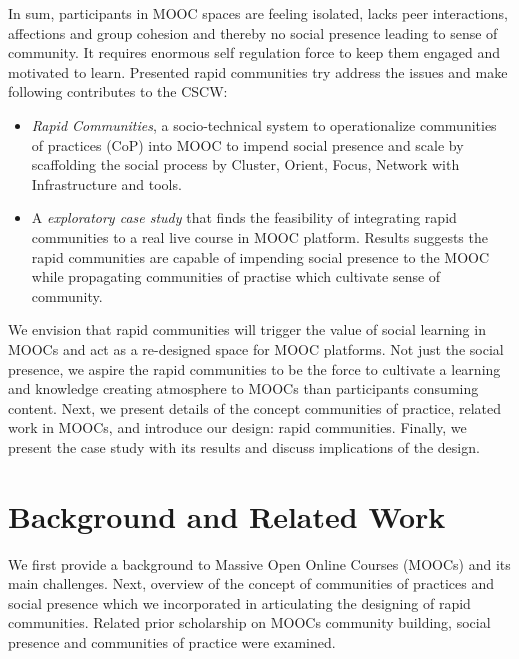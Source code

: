 \documentclass[manuscript,screen,review]{acmart}
\begin{document}
In sum, participants in MOOC spaces are feeling isolated, lacks peer interactions, affections and group cohesion  and thereby no social presence leading to sense of community. It requires enormous self regulation force to keep them engaged and motivated to learn. Presented rapid communities try address the issues and make following contributes to the CSCW: 

\begin{itemize}
\item \textit{Rapid Communities}, a socio-technical system to operationalize communities of practices (CoP) into MOOC to impend social presence and scale by scaffolding the social process by Cluster, Orient, Focus, Network with Infrastructure and tools.  
\item A \textit{exploratory case study} that finds the feasibility of integrating rapid communities to a real live course in MOOC platform. Results suggests the rapid communities are capable of impending social presence to the MOOC while propagating communities of practise which cultivate sense of community.
\end{itemize}

We envision that rapid communities will trigger the value of social learning in MOOCs and act as a re-designed space for MOOC platforms. Not just the social presence, we aspire the rapid communities to be the force to cultivate a learning and knowledge creating atmosphere to MOOCs than participants consuming content. Next, we present details of the concept communities of practice, related work in MOOCs, and introduce our design: rapid communities. Finally, we present the case study with its results and discuss implications of the design.

\section{Background and Related Work}
We first provide a background to Massive Open Online Courses (MOOCs) and its main challenges. Next, overview of the concept of communities of practices and social presence which we incorporated in articulating the designing of rapid communities. Related prior scholarship on MOOCs community building, social presence and communities of practice were examined. 
\end{document}
